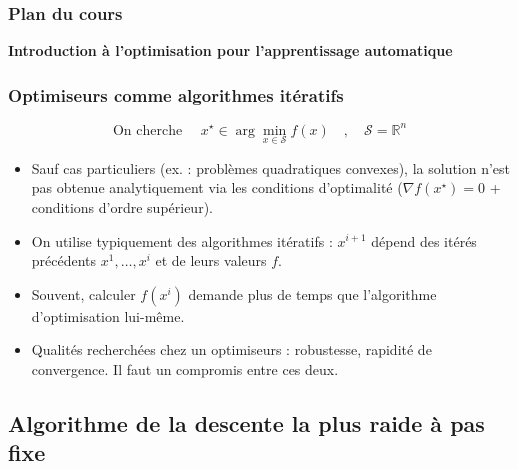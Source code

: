\documentclass[12pt]{beamer}
\begin{document}
\begin{frame}%
\frametitle{Plan du cours} 
\begin{multicols}{2}
\begin{center} \textbf{Introduction à l’optimisation pour l’apprentissage automatique} \end{center}
\tableofcontents[currentsection]
\end{multicols}
\end{frame}


\begin{frame}
\frametitle{Optimiseurs comme algorithmes itératifs} 
\begin{equation*}
\text{On cherche } \quad  x^\star \in \arg\min_{x \in \mathcal S} f(x) \quad,\quad \mathcal S = \mathbb{R}^n
\end{equation*}
\begin{itemize}
\item Sauf cas particuliers (ex. : problèmes quadratiques convexes), la solution n’est pas obtenue analytiquement via les conditions d’optimalité ($\nabla f(x^\star) = 0$ + conditions d’ordre supérieur).
\item On utilise typiquement des algorithmes itératifs : $x^{i+1}$ dépend des itérés précédents $x^1, \ldots, x^i$ et de leurs valeurs $f$.
\item Souvent, calculer $f(x^i)$ demande plus de temps que l’algorithme d’optimisation lui-même.
\item Qualités recherchées chez un optimiseurs : robustesse, rapidité de convergence. Il faut un compromis entre ces deux.
\end{itemize}
\end{frame}

\subsection{Algorithme de la descente la plus raide à pas fixe}
\end{document}
